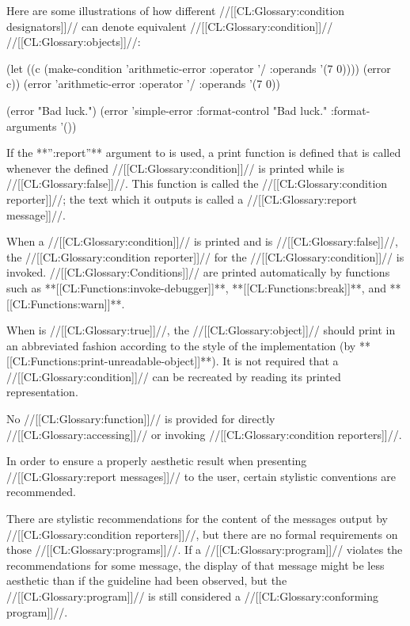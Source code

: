 Here are some illustrations of how different //[[CL:Glossary:condition designators]]//
can denote equivalent //[[CL:Glossary:condition]]// //[[CL:Glossary:objects]]//:

\code
(let ((c (make-condition 'arithmetic-error :operator '/ :operands '(7 0))))
  (error c))
\EQ (error 'arithmetic-error :operator '/ :operands '(7 0))

(error "Bad luck.")
\EQ (error 'simple-error :format-control "Bad luck." :format-arguments '())
\endcode


\endsubsubsection%

\endsubsection%
 
 
If the **'':report''** argument to  is used,
a print function is defined that is called whenever 
the defined //[[CL:Glossary:condition]]// is printed while  is //[[CL:Glossary:false]]//. 
This function is called the //[[CL:Glossary:condition reporter]]//;
the text which it outputs is called a //[[CL:Glossary:report message]]//.

When a //[[CL:Glossary:condition]]// is printed and 
is //[[CL:Glossary:false]]//, the //[[CL:Glossary:condition reporter]]// for the //[[CL:Glossary:condition]]// is invoked.
//[[CL:Glossary:Conditions]]// are printed automatically by functions such as
**[[CL:Functions:invoke-debugger]]**, **[[CL:Functions:break]]**, and **[[CL:Functions:warn]]**.

When  is //[[CL:Glossary:true]]//, the //[[CL:Glossary:object]]// should print in an
abbreviated fashion according to the style of the implementation
(\eg by **[[CL:Functions:print-unreadable-object]]**).  It is not required that a
//[[CL:Glossary:condition]]// can be recreated by reading its printed representation.
 
No //[[CL:Glossary:function]]// is provided for directly //[[CL:Glossary:accessing]]// 
or invoking //[[CL:Glossary:condition reporters]]//.
 

In order to ensure a properly aesthetic result when presenting
//[[CL:Glossary:report messages]]// to the user, certain stylistic conventions are
recommended.

There are stylistic recommendations for the content of the messages
output by //[[CL:Glossary:condition reporters]]//, but there are no formal requirements 
on those //[[CL:Glossary:programs]]//.
If a //[[CL:Glossary:program]]// violates the recommendations for some message, the
display of that message might be less aesthetic than if the guideline
had been observed, but the //[[CL:Glossary:program]]// is still considered a
//[[CL:Glossary:conforming program]]//.

